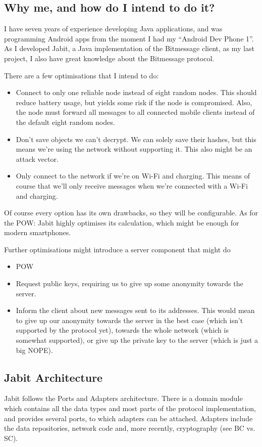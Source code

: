 \documentclass{bfh}
\begin{document}
  \subsection{Why me, and how do I intend to do it?}
  I have seven years of experience developing Java applications, and was programming Android apps from the moment I had my ``Android Dev Phone 1''. As I developed Jabit, a Java implementation of the Bitmessage client, as my last project, I also have great knowledge about the Bitmessage protocol.

  There are a few optimisations that I intend to do:
  \begin{itemize}
    \item Connect to only one reliable node instead of eight random nodes. This should reduce battery usage, but yields some risk if the node is compromised. Also, the node must forward all messages to all connected mobile clients instead of the default eight random nodes.
    \item Don't save objects we can't decrypt. We can solely save their hashes, but this means we're using the network without supporting it. This also might be an attack vector.
    \item Only connect to the network if we're on Wi-Fi and charging. This means of course that we'll only receive messages when we're connected with a Wi-Fi and charging.
  \end{itemize}
  Of course every option has its own drawbacks, so they will be configurable. As for the POW: Jabit highly optimises its calculation, which might be enough for modern smartphones.

  Further optimisations might introduce a server component that might do
  \begin{itemize}
    \item POW
    \item Request public keys, requiring us to give up some anonymity towards the server.
    \item Inform the client about new messages sent to its addresses. This would mean to give up our anonymity towards the server in the best case (which isn't supported by the protocol yet), towards the whole network (which is somewhat supported), or give up the private key to the server (which is just a big NOPE).
  \end{itemize}

  \subsection{Jabit Architecture}
  Jabit follows the Ports and Adapters architecture. There is a domain module which contains all the data types and most parts of the protocol implementation, and provides several ports, to which adapters can be attached. Adapters include the data repositories, network code and, more recently, cryptography (see BC vs. SC).
\end{document}
